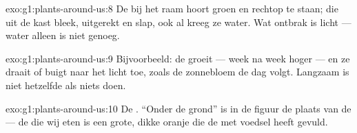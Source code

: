 \begin{solution}{exo:g1:plants-around-us:8}
De  bij het raam hoort groen en rechtop te staan; die uit de kast
bleek, uitgerekt en slap, ook al kreeg ze water. Wat ontbrak is licht
--- water alleen is niet genoeg.
\end{solution}

\begin{solution}{exo:g1:plants-around-us:9}
Bijvoorbeeld: de  groeit --- week na week hoger --- en ze draait
of buigt naar het licht toe, zoals de zonnebloem de dag volgt. Langzaam
is niet hetzelfde als niets doen.
\end{solution}

\begin{solution}{exo:g1:plants-around-us:10}
De . ``Onder de grond'' is in de figuur de plaats van de 
--- de  die wij eten is een grote, dikke oranje  die de
 met voedsel heeft gevuld.
\end{solution}
